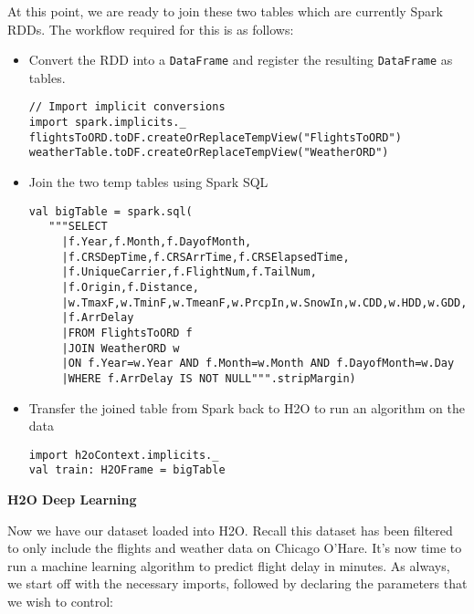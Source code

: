 At this point, we are ready to join these two tables which are currently Spark RDDs. The workflow required for this is as follows:
\begin{itemize}
\item Convert the RDD into a \texttt{DataFrame} and register the resulting \texttt{DataFrame} as tables.
\begin{lstlisting}[style=Scala]
// Import implicit conversions
import spark.implicits._
flightsToORD.toDF.createOrReplaceTempView("FlightsToORD")
weatherTable.toDF.createOrReplaceTempView("WeatherORD")
\end{lstlisting}
\item Join the two temp tables using Spark SQL 
\begin{lstlisting}[style=Scala]
val bigTable = spark.sql(
   """SELECT
     |f.Year,f.Month,f.DayofMonth,
     |f.CRSDepTime,f.CRSArrTime,f.CRSElapsedTime,
     |f.UniqueCarrier,f.FlightNum,f.TailNum,
     |f.Origin,f.Distance,
     |w.TmaxF,w.TminF,w.TmeanF,w.PrcpIn,w.SnowIn,w.CDD,w.HDD,w.GDD,
     |f.ArrDelay
     |FROM FlightsToORD f
     |JOIN WeatherORD w
     |ON f.Year=w.Year AND f.Month=w.Month AND f.DayofMonth=w.Day
     |WHERE f.ArrDelay IS NOT NULL""".stripMargin)
\end{lstlisting}

\item Transfer the joined table from Spark back to H2O to run an algorithm on the data
\begin{lstlisting}[style=Scala]
import h2oContext.implicits._
val train: H2OFrame = bigTable
\end{lstlisting}
\end{itemize}


\textbf{H2O Deep Learning}

Now we have our dataset loaded into H2O. Recall this dataset has been filtered to only include the flights and weather data on Chicago O'Hare. It's now time to run a machine learning algorithm to predict flight delay in minutes. As always, we start off with the necessary imports, followed by declaring the parameters that we wish to control:

